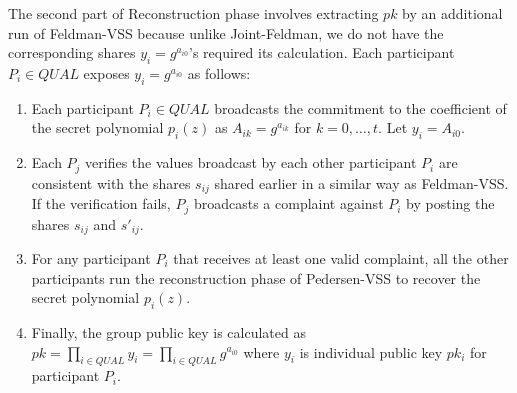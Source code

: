 \documentclass[letterpaper,twocolumn,10pt]{article}
\theoremstyle{definition}
\theoremstyle{remark}
\begin{document}
\begin{itemize}
\begin{enumerate}
    The second part of Reconstruction phase involves extracting $pk$ by an additional run of Feldman-VSS because unlike Joint-Feldman,  we do not have the corresponding shares $y_i = g^{a_{i0}}$'s required its calculation.  Each participant $P_i \in QUAL$ exposes $y_i = g^{a_{i0}}$ as follows:
        \begin{enumerate}
            \item Each participant $P_i \in QUAL$ broadcasts the commitment to the coefficient of the secret polynomial $p_i(z)$ as $A_{ik} = g^{a_{ik}}$ for $k = 0, \ldots, t$. Let $y_i = A_{i0}$.
            \item Each $P_j$ verifies the values broadcast by each other participant $P_i$ are consistent with the shares $s_{ij}$ shared earlier in a similar way as Feldman-VSS. If the verification fails, $P_j$ broadcasts a complaint against $P_i$ by posting the shares $s_{ij}$ and $s'_{ij}$.
            \item For any participant $P_i$ that receives at least one valid complaint, all the other participants run the reconstruction phase of Pedersen-VSS to recover the secret polynomial $p_i(z)$. 
            \item Finally, the group public key is calculated as $pk = \prod_{i \in QUAL} y_i = \prod_{i \in QUAL} g^{a_{i0}}$ where $y_i$ is individual public key $pk_i$ for participant $P_i$.
        \end{enumerate}
    \end{enumerate}
\end{itemize}
\end{document}
